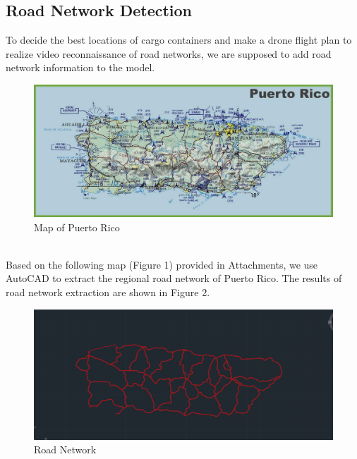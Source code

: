 \documentclass{mcmthesis}
\begin{document}
\subsection{Road Network Detection}
To decide the best locations of cargo containers and make a drone flight plan to realize video reconnaissance of road networks, we are supposed to add road network information to the model.     
\begin{figure}[h]
	\small
	\centering
	\includegraphics[width=15cm]{1.jpg}
	\caption{Map of Puerto Rico} \label{fig:Map of Puerto Rico}
\end{figure}\\
Based on the following map (Figure 1) provided in Attachments, we use AutoCAD to extract the regional road network of Puerto Rico. The results of road network extraction are shown in Figure 2. 
\begin{figure}[h]
	\small
	\centering
	\includegraphics[width=15cm]{8.png}
	\caption{Road Network} \label{fig:2}
\end{figure}
\end{document}
